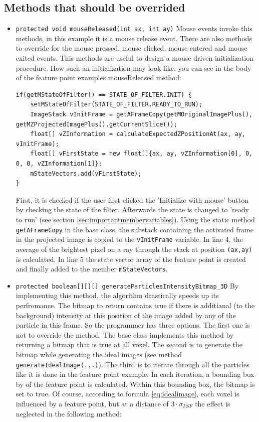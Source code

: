 \documentclass{scrartcl}
\begin{document}
\subsection{Methods that should be overrided}
\label{sec:methodsthatshouldbeoverrided}
\begin{itemize}
\item{\lstinline{protected void mouseReleased(int ax, int ay)}} Mouse events invoke this methods, in this example it is a mouse release event. There are also methods to override for the mouse pressed, mouse clicked, mouse entered and mouse exited events. This methods are useful to design a mouse driven initialization procedure. 
How such an initialization may look like, you can see in the body of the feature point examples mouseReleased method:
\begin{lstlisting}
if(getMStateOfFilter() == STATE_OF_FILTER.INIT) {
	setMStateOfFilter(STATE_OF_FILTER.READY_TO_RUN);
	ImageStack vInitFrame = getAFrameCopy(getMOriginalImagePlus(), getMZProjectedImagePlus().getCurrentSlice());
	float[] vZInformation = calculateExpectedZPositionAt(ax, ay, vInitFrame);
	float[] vFirstState = new float[]{ax, ay, vZInformation[0], 0, 0, 0, vZInformation[1]};
	mStateVectors.add(vFirstState);
}
\end{lstlisting}
First, it is checked if the user first clicked the 'Initialize with mouse' button by checking the state of the filter. Afterwards the state is changed to 'ready to run' (see section \ref{sec:importantmembervariables}). Using the static method \texttt{getAFrameCopy} in the base class, the substack containing the activated frame in the projected image is copied to the \texttt{vInitFrame} variable. In line 4, the average of the brightest pixel on a ray through the stack at position \texttt{(ax,ay)} is calculated. In line 5 the state vector array of the feature point is created and finally added to the member \texttt{mStateVectors}.


\item{\lstinline{protected boolean[][][] generateParticlesIntensityBitmap_3D}} By implementing this method, the algorithm drastically speeds up its perfromance. The bitmap to return contains true if there is additianal (to the background) intensity at this position of the image added by any of the particle in this frame. So the programmer has three options. The first one is not to override the method. The base class implements this method by returning a bitmap that is true at all voxel. The second is to generate the bitmap while generating the ideal images (see method \texttt{generateIdealImage(...)}). The third is to iterate through all the particles like it is done in the feature point example. In each iteration, a bounding box by of the feature point is calculated. Within this bounding box, the bitmap is set to true. Of course, according to formula \ref{eq:idealimage}, each voxel is influenced by a feature point, but at a distance of $3\cdot \sigma_{PSF}$ the effect is neglected in the following method:


\end{itemize}
\end{document}
